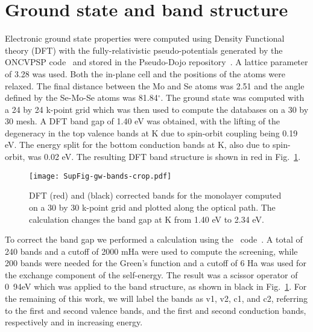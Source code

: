 \documentclass[prb,aps,superscriptaddress,reprint,floatfix]{revtex4-1}
\begin{document}
\section{Ground state and band structure}
\label{dft_gw}
Electronic ground state properties were computed using Density Functional theory (DFT) with the fully-relativistic pseudo-potentials generated by the ONCVPSP code~\cite{PhysRevB.88.085117} and stored in the Pseudo-Dojo repository~\cite{VanSetten2018}. A lattice parameter of 3.28 \ag was used. Both the in-plane cell and the positions of the atoms were relaxed. The final distance between the Mo and Se atoms was 2.51 \ag and the angle defined by the Se-Mo-Se atoms was 81.84$^\circ$. The ground state was computed with a 24 by 24 k-point grid which was then used to compute the databases on a 30 by 30 mesh. A DFT band gap of 1.40 eV was obtained, with the lifting of the degeneracy in the top valence bands at K due to spin-orbit coupling being 0.19 eV. The energy split for the bottom conduction bands at K, also due to spin-orbit, was 0.02 eV. The resulting DFT band structure is shown in red in Fig.~\ref{fig:dft_gw}.

\begin{figure}[ht]
	\texttt{[image: SupFig-gw-bands-crop.pdf]}
\caption{DFT (red) and \gw (black) corrected bands for the \mose monolayer computed on a 30 by 30 k-point grid and plotted along the optical path. The \gw calculation changes the band gap at K from 1.40 eV to 2.34 eV. 
}
\label{fig:dft_gw}
\end{figure}

To correct the band gap we performed a \gw calculation using the \Yambo~code~\cite{Sangalli2019}. A total of 240 bands and a cutoff of 2000 mHa were used to compute the screening, while 200 bands were needed for the Green's function and a cutoff of 6 Ha was used for the exchange component of the self-energy. The result was a scissor operator of \unit{0.94}{eV} which was applied to the band structure, as shown in black in Fig.~\ref{fig:dft_gw}. For the remaining of this work, we will label the bands as v1, v2, c1, and c2, referring to the first and second valence bands, and the first and second conduction bands, respectively and in increasing energy. 

\end{document}
